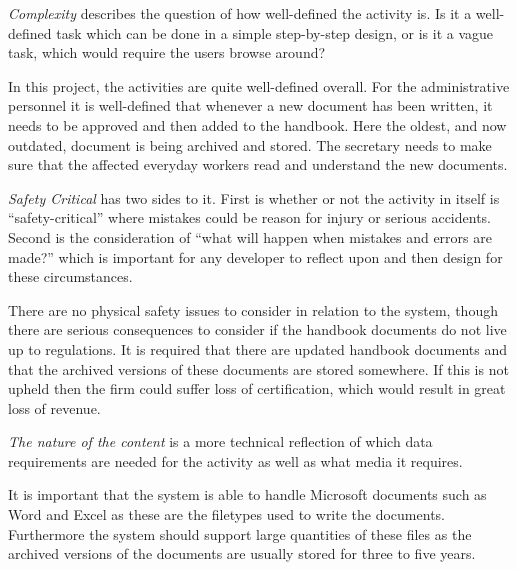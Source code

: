 
\textit{Complexity} describes the question of how well-defined the activity is.
Is it a well-defined task which can be done in a simple step-by-step design,
or is it a vague task, which would require the users browse around?

In this project, the activities are quite well-defined overall.
For the administrative personnel it is well-defined that whenever a new document has been written, it needs to be approved and then added to the handbook.
Here the oldest, and now outdated, document is being archived and stored.
The secretary needs to make sure that the affected everyday workers read and understand the new documents.

\textit{Safety Critical} has two sides to it.
First is whether or not the activity in itself is ``safety-critical'' where mistakes could be reason for injury or serious accidents.
Second is the consideration of ``what will happen when mistakes and errors are made?'' which is important for any developer to reflect upon and then design for these circumstances.

There are no physical safety issues to consider in relation to the system, though there are serious consequences to consider if the handbook documents do not live up to regulations.
It is required that there are updated handbook documents and that the archived versions of these documents are stored somewhere.
If this is not upheld then the firm could suffer loss of certification, which would result in great loss of revenue.

\textit{The nature of the content} is a more technical reflection of which data requirements are needed for the activity as well as what media it requires.

It is important that the system is able to handle Microsoft documents such as Word and Excel as these are the filetypes used to write the documents.
Furthermore the system should support large quantities of these files as the archived versions of the documents are usually stored for three to five years.

